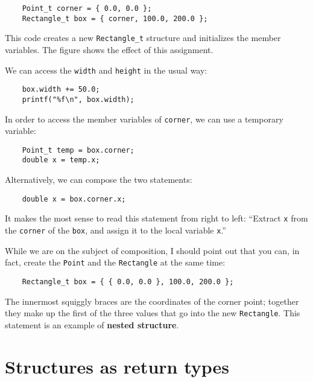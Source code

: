 \begin{verbatim}
	Point_t corner = { 0.0, 0.0 };
	Rectangle_t box = { corner, 100.0, 200.0 };
\end{verbatim}
%
This code creates a new {\tt Rectangle\_t} structure and initializes the
member variables.  The figure shows the effect of this assignment.

\vspace{0.1in}
\centerline{}
\vspace{0.1in}
%
We can access the {\tt width} and {\tt height} in the usual way:

\begin{verbatim}
	box.width += 50.0;
	printf("%f\n", box.width);
\end{verbatim}
%
In order to access the member variables of {\tt corner}, we can use a
temporary variable:

\begin{verbatim}
	Point_t temp = box.corner;
	double x = temp.x;
\end{verbatim}
%
Alternatively, we can compose the two statements:


\begin{verbatim}
	double x = box.corner.x;
\end{verbatim}
%
It makes the most sense to read this statement from right to
left: ``Extract {\tt x} from the {\tt corner} of the {\tt box},
and assign it to the local variable {\tt x}.''

While we are on the subject of composition, I should point
out that you can, in fact, create the {\tt Point} and the
{\tt Rectangle} at the same time:

\begin{verbatim}
	Rectangle_t box = { { 0.0, 0.0 }, 100.0, 200.0 };
\end{verbatim}
%
The innermost squiggly braces are the coordinates of the
corner point; together they make up the first of the three
values that go into the new {\tt Rectangle}.  This statement
is an example of {\bf nested structure}.



\section{Structures as return types}


